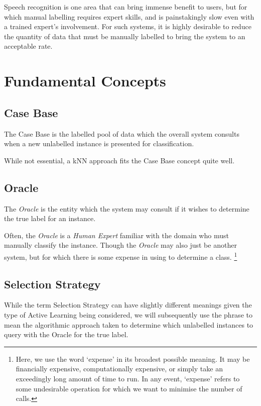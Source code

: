 \documentclass[a4paper,11pt]{report}
\begin{document}
Speech recognition is one area that can bring immense benefit to users, but for which manual labelling requires expert skills, and is painstakingly slow even with a trained expert's involvement. For such systems, it is highly desirable to reduce the quantity of data that must be manually labelled to bring the system to an acceptable rate.


\section{Fundamental Concepts}
\subsection{Case Base}
The Case Base is the labelled pool of data which the overall system consults when a new unlabelled instance is presented for classification.

While not essential, a kNN approach fits the Case Base concept quite well.

\subsection{Oracle}
The \emph{Oracle} is the entity which the system may consult if it wishes to determine the true label for an instance.

Often, the \emph{Oracle} is a \emph{Human Expert} familiar with the domain who must manually classify the instance. Though the \emph{Oracle} may also just be another system, but for which there is some expense in using to determine a class. \footnote{Here, we use the word `expense' in its broadest possible meaning. It may be financially expensive, computationally expensive, or simply take an exceedingly long amount of time to run. In any event, `expense' refers to some undesirable operation for which we want to minimise the number of calls.}

\subsection{Selection Strategy}
While the term Selection Strategy can have slightly different meanings given the type of Active Learning being considered, we will subsequently use the phrase to mean the algorithmic approach taken to determine which unlabelled instances to query with the Oracle for the true label.
\end{document}
